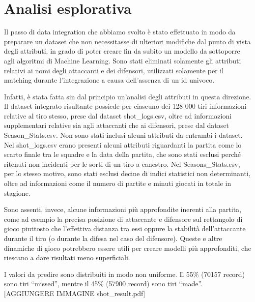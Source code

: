 \section{Analisi esplorativa}

Il passo di data integration che abbiamo svolto è stato effettuato in modo da preparare un dataset che non necessitasse di ulteriori modifiche dal punto di vista degli attributi, in grado di poter creare fin da subito un modello da sottoporre agli algoritmi di Machine Learning. Sono stati eliminati solamente gli attributi relativi ai nomi degli attaccanti e dei difensori, utilizzati solamente per il matching durante l’integrazione a causa dell’assenza di un id univoco.

\par
Infatti, è stata fatta sin dal principio un’analisi degli attributi in questa direzione. Il dataset integrato risultante possiede per ciascuno dei 128 000 tiri informazioni relative al tiro stesso, prese dal dataset shot_logs.csv, oltre ad informazioni supplementari relative sia agli attaccanti che ai difensori, prese dal dataset Season_Stats.csv. Non sono stati inclusi alcuni attributi da entrambi i dataset. Nel shot_logs.csv erano presenti alcuni attributi riguardanti la partita come lo scarto finale tra le squadre e la data della partita, che sono stati esclusi perché ritenuti non incidenti per le sorti di un tiro a canestro. Nel Seasons_Stats.csv, per lo stesso motivo, sono stati esclusi decine di indici statistici non determinanti, oltre ad informazioni come il numero di partite e minuti giocati in totale in stagione.

\par
Sono assenti, invece, alcune informazioni più approfondite inerenti alla partita, come ad esempio la precisa posizione di attaccante e difensore sul rettangolo di gioco piuttosto che l’effettiva distanza tra essi oppure la stabilità dell’attaccante durante il tiro (o durante la difesa nel caso del difensore). Queste e altre dinamiche di gioco potrebbero essere utili per creare modelli più approfonditi, che riescano a dare risultati meno superficiali.

\par
I valori da predire sono distribuiti in modo non uniforme. Il 55\% (70157 record) sono tiri “missed”, mentre il 45\% (57900 record) sono tiri “made”. [AGGIUNGERE IMMAGINE shot_result.pdf]
